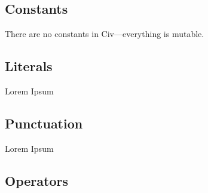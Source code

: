 \documentclass[a4paper]{article}
\begin{document}
\begin{multicols}{2}
\noindent 
{}
\end{multicols}


\subsection{Constants}

There are no constants in Civ—everything is mutable. 

\subsection{Literals}

Lorem Ipsum

\subsection{Punctuation}

Lorem Ipsum

\subsection{Operators}
\end{document}
